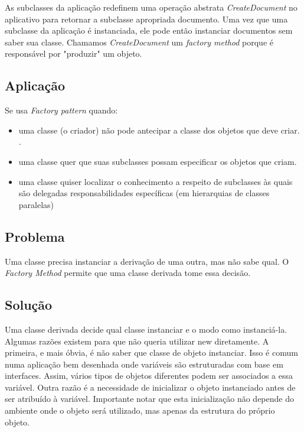 As subclasses da aplicação redefinem uma operação abstrata \emph{CreateDocument} no 
aplicativo para retornar a subclasse apropriada documento. Uma vez que uma subclasse da aplicação é instanciada, ele pode então instanciar documentos sem saber sua classe. Chamamos \emph{CreateDocument} um \emph{factory method} porque é
responsável por "produzir" um objeto.\cite{gamma95}

\subsection{Aplicação}
\label{sub:fac_aplica}

Se usa \emph{Factory pattern} quando:\cite{gamma95}

\begin{itemize}
	\item uma classe (o criador) não pode antecipar a classe dos objetos que deve criar.
.	\item uma classe quer que suas subclasses possam especificar os objetos que criam.
	\item uma classe quiser localizar o conhecimento a respeito de subclasses às quais são delegadas responsabilidades específicas (em hierarquias de classes paralelas)

\end{itemize}


\subsection{Problema}
\label{sub:fac_problema}

Uma classe precisa instanciar a derivação de uma outra, mas não sabe qual. O \emph{Factory Method} permite que uma classe derivada tome essa decisão.

\subsection{Solução}
\label{sub:fac_solucao}

Uma classe derivada decide qual classe instanciar e o modo como instanciá-la.
Algumas razões existem para que não queria utilizar new diretamente. A primeira, e
mais óbvia, é não saber que classe de objeto instanciar.
Isso é comum numa aplicação bem desenhada onde variáveis são estruturadas com
base em interfaces. Assim, vários tipos de objetos diferentes podem ser associados a
essa variável. Outra razão é a necessidade de inicializar o objeto instanciado antes de ser
atribuído à variável. Importante notar
que esta inicialização não depende do ambiente onde o objeto será utilizado, mas apenas
da estrutura do próprio objeto.\cite{fact1} \cite{gamma95}



